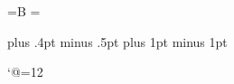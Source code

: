 \def\tracingall{\tracingonline\@ne\tracingcommands\tw@\tracingstats\tw@
  \tracingpages\@ne\tracingoutput\@ne\tracinglostchars\@ne
  \tracingmacros\tw@\tracingparagraphs\@ne\tracingrestores\@ne
  \showboxbreadth\maxdimen\showboxdepth\maxdimen\errorstopmode}

\def\showhyphens#1{\setbox0\vbox{\parfillskip\z@skip\hsize\maxdimen\tenrm
  \pretolerance\m@ne\tolerance\m@ne\hbadness0\showboxdepth0\ #1}}

%
%




%



=\hbox{\tenex B} \p@renwd= %

\normalbaselines
\xpt

\nonfrenchspacing %


\def\fmtname{plplain}
\def\fmtversion{p2.09J-12/24/93} %




\kanjiskip=0pt plus .4pt minus .5pt
\xkanjiskip=1.5pt plus 1pt minus 1pt
\autospacing\autoxspacing
\def\<{\inhibitglue}

\catcode`@=12 %
